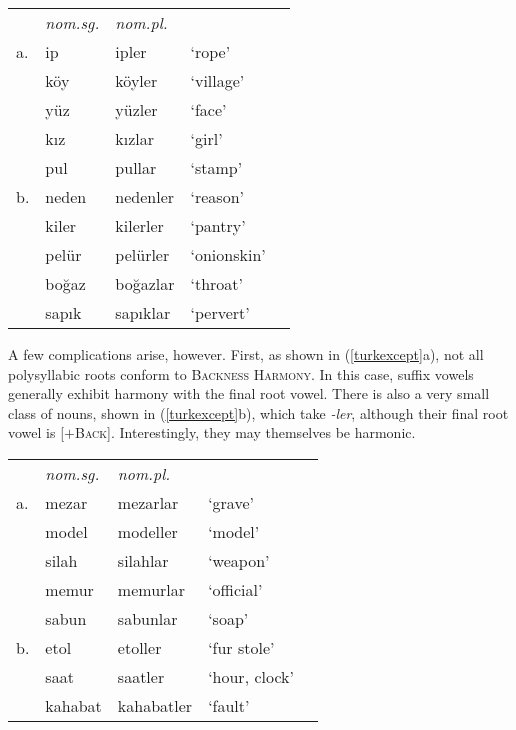 \begin{example}
\label{turknom}
\begin{tabular}{lllll}
   & \emph{nom.sg.} & \emph{nom.pl.} \\
a. & {ip}           & {ipler}    & `rope'         & \citep[][216]{Clements1982} \\
   & {köy}          & {köyler}   & `village'      \\
   & {yüz}          & {yüzler}   & `face'         \\
   & {kız}          & {kızlar}   & `girl'         \\
   & {pul}          & {pullar}   & `stamp'        \\
b. & {neden}        & {nedenler} & `reason'       & \citep{TELL} \\
   & {kiler}        & {kilerler} & `pantry'       \\
   & {pelür}        & {pelürler} & `onionskin'    \\
   & {boğaz}        & {boğazlar} & `throat'       \\
   & {sapık}        & {sapıklar} & `pervert'      \\
\end{tabular}
\end{example}

A few complications arise, however. First, as shown in (\ref{turkexcept}a), not all polysyllabic roots conform to \textsc{Backness Harmony}. In this case, suffix vowels generally exhibit harmony with the final root vowel. There is also a very small class of nouns, shown in (\ref{turkexcept}b), which take \emph{-ler}, although their final root vowel is [$+$\textsc{Back}]. Interestingly, they may themselves be harmonic.

\begin{example} 
\label{turkexcept}
\begin{tabular}{lllll}
   & \emph{nom.sg.} & \emph{nom.pl.}&                    \\
a. & {mezar}        & {mezarlar}    & `grave'       & \citep{TELL}       \\
   & {model}        & {modeller}    & `model'                            \\
   & {silah}        & {silahlar}    & `weapon'                           \\
   & {memur}        & {memurlar}    & `official'                         \\
   & {sabun}        & {sabunlar}    & `soap'                             \\
b. & {etol}         & {etoller}     & `fur stole'   & \citep{Goksel2005} \\
   & {saat}         & {saatler}     & `hour, clock' 	              \\
   & {kahabat}      & {kahabatler}  & `fault'       \\
\end{tabular}
\end{example}


